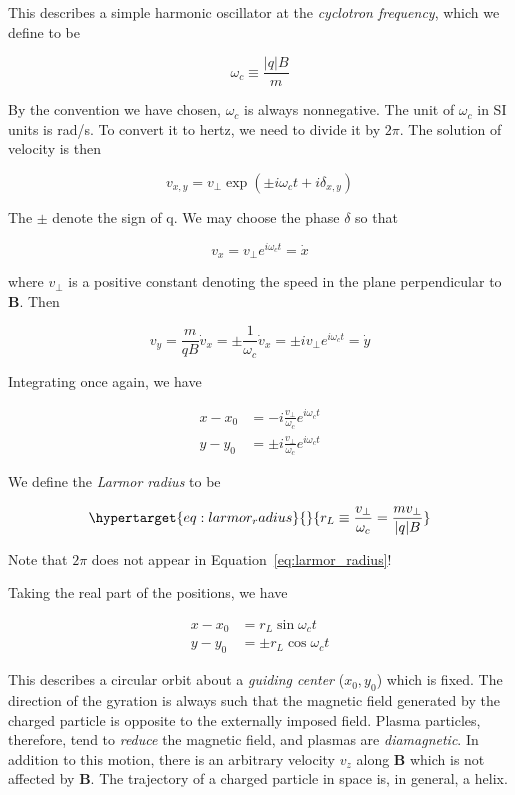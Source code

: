 \documentclass[
  notoc %
]{tufte-book}
\begin{document}
This describes a simple harmonic oscillator at the \emph{cyclotron
frequency}, which we define to be

\[
\omega_c \equiv \frac{| q | B}{m}
\]

By the convention we have chosen, \(\omega_c\) is always nonnegative.
The unit of \(\omega_c\) in SI units is rad/s. To convert it to hertz,
we need to divide it by \(2\pi\). The solution of velocity is then

\[
v_{x,y} = v_\perp \exp(\pm i \omega_c t + i\delta_{x,y})
\]

The \(\pm\) denote the sign of q. We may choose the phase \(\delta\) so
that

\[
v_x = v_\perp e^{i\omega_c t} = \dot{x}
\]

where \(v_\perp\) is a positive constant denoting the speed in the plane
perpendicular to \(\mathbf{B}\). Then

\[
v_y  = \frac{m}{qB} \dot{v}_x = \pm \frac{1}{\omega_c}\dot{v}_x = \pm i v_\perp e^{i\omega_c t} = \dot{y}
\]

Integrating once again, we have

\[
\begin{aligned}
x - x_0 &= -i\frac{v_\perp}{\omega_c}e^{i\omega_c t} \\
y - y_0 &= \pm i\frac{v_\perp}{\omega_c}e^{i\omega_c t}
\end{aligned}
\]

We define the \emph{Larmor radius} to be

\begin{equation}\protect\hypertarget{eq:larmor_radius}{}{
r_L \equiv \frac{v_\perp}{\omega_c} = \frac{mv_\perp}{|q| B}
}\label{eq:larmor_radius}\end{equation}

Note that \(2\pi\) does not appear in Equation~\ref{eq:larmor_radius}!

Taking the real part of the positions, we have

\[
\begin{aligned}
x - x_0 &= r_L\sin\omega_c t \\
y - y_0 &= \pm r_L \cos\omega_c t
\end{aligned}
\]

This describes a circular orbit about a \emph{guiding center}
(\(x_0, y_0\)) which is fixed. The direction of the gyration is always
such that the magnetic field generated by the charged particle is
opposite to the externally imposed field. Plasma particles, therefore,
tend to \emph{reduce} the magnetic field, and plasmas are
\emph{diamagnetic}. In addition to this motion, there is an arbitrary
velocity \(v_z\) along \(\mathbf{B}\) which is not affected by
\(\mathbf{B}\). The trajectory of a charged particle in space is, in
general, a helix.
\end{document}

